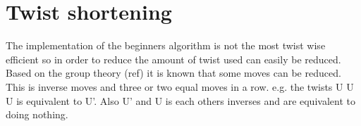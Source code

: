 







\section{Twist shortening}
The implementation of the beginners algorithm is not the most twist wise efficient so in order to reduce the amount of twist used can easily be reduced. Based on the group theory (ref) it is known that some moves can be reduced. This is inverse moves and  three or two equal moves  in a row. e.g.  the twists U U U is equivalent to U'. Also U' and U is each others inverses and are equivalent to doing nothing. 